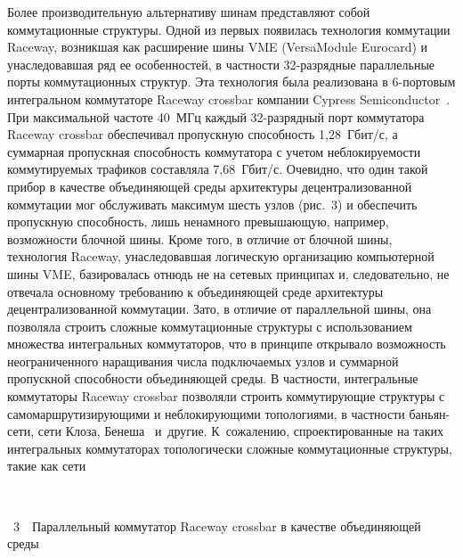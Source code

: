\begin{multicols}{2}
     
     Более производительную альтернативу шинам представляют собой коммутационные 
структуры. Одной из первых появилась технология коммутации Raceway, возникшая как 
расширение шины VME (VersaModule Eurocard)
и унаследовавшая ряд ее особенностей, в частности 32-разрядные 
параллельные порты коммутационных структур. Эта технология была реализована в 
6-портовым интегральном коммутаторе Raceway crossbar компании Cypress 
Semiconductor~\cite{6eg}. При максимальной частоте 40~МГц каждый 32-разрядный порт 
коммутатора Raceway crossbar обеспечивал пропускную способность 1,28~Гбит/с, а 
суммарная пропускная способность коммутатора с учетом неблокируемости коммутируемых 
трафиков составляла 7,68~Гбит/с. Очевидно, что один такой прибор в качестве 
объединяющей среды архитектуры децентрализованной коммутации мог обслуживать 
максимум шесть узлов (рис.~3) и обеспечить пропускную способность, лишь 
ненамного превышающую, например, возможности блочной шины. Кроме того, в отличие от 
блочной шины, технология Raceway, унаследовавшая логическую организацию 
компьютерной шины VME, базировалась отнюдь не на сетевых принципах и, следовательно, 
не отвечала основному требованию к объеди\-ня\-ющей среде архитектуры децентрализованной 
коммутации. Зато, в отличие от параллельной шины, она позволяла строить сложные 
коммутационные структуры с использованием множества интегральных коммутаторов, что в 
принципе открывало возможность неограниченного наращивания числа подключаемых 
узлов и суммарной пропускной способности объединяющей среды. В частности, 
интегральные коммутаторы Raceway crossbar позволяли строить коммутирующие структуры 
с самомаршрутизирующими и неблокирующими топологиями, в частности баньян-сети, сети 
Клоза, Бенеша~\cite{7eg} и~другие. К~сожалению, спроектированные на таких
интегральных 
коммутаторах топологически сложные коммутационные структуры, такие как сети\linebreak

\begin{center}
\mbox{%
\epsfxsize=63.994mm
}
\end{center}
{{\figurename~3}\ \ \small{Параллельный коммутатор Raceway crossbar в качестве объединяющей среды}}

\bigskip
\addtocounter{figure}{1}


\end{multicols}
